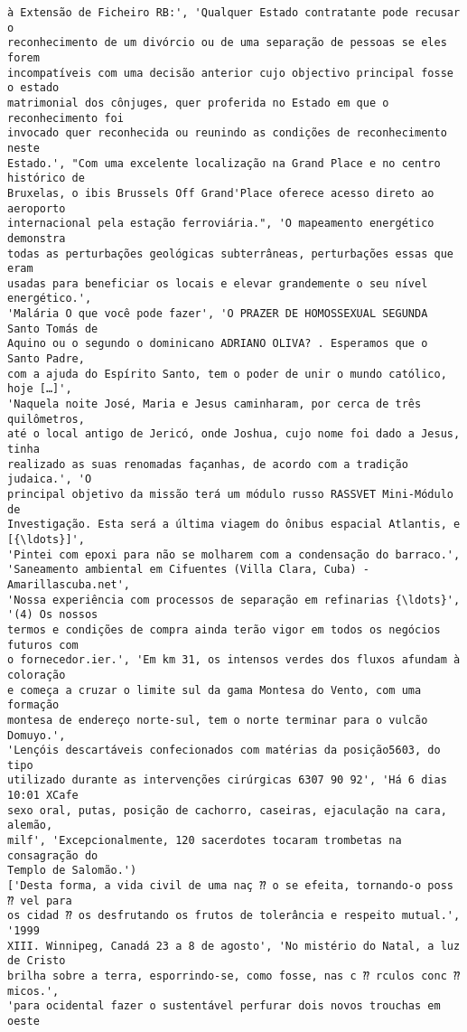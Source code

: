 \documentclass[10pt]{article}
\begin{document}
\begin{Verbatim}[commandchars=\\\{\}]
à Extensão de Ficheiro RB:', 'Qualquer Estado contratante pode recusar o
reconhecimento de um divórcio ou de uma separação de pessoas se eles forem
incompatíveis com uma decisão anterior cujo objectivo principal fosse o estado
matrimonial dos cônjuges, quer proferida no Estado em que o reconhecimento foi
invocado quer reconhecida ou reunindo as condições de reconhecimento neste
Estado.', "Com uma excelente localização na Grand Place e no centro histórico de
Bruxelas, o ibis Brussels Off Grand'Place oferece acesso direto ao aeroporto
internacional pela estação ferroviária.", 'O mapeamento energético demonstra
todas as perturbações geológicas subterrâneas, perturbações essas que eram
usadas para beneficiar os locais e elevar grandemente o seu nível energético.',
'Malária O que você pode fazer', 'O PRAZER DE HOMOSSEXUAL SEGUNDA Santo Tomás de
Aquino ou o segundo o dominicano ADRIANO OLIVA? . Esperamos que o Santo Padre,
com a ajuda do Espírito Santo, tem o poder de unir o mundo católico, hoje […]',
'Naquela noite José, Maria e Jesus caminharam, por cerca de três quilômetros,
até o local antigo de Jericó, onde Joshua, cujo nome foi dado a Jesus, tinha
realizado as suas renomadas façanhas, de acordo com a tradição judaica.', 'O
principal objetivo da missão terá um módulo russo RASSVET Mini-Módulo de
Investigação. Esta será a última viagem do ônibus espacial Atlantis, e [{\ldots}]',
'Pintei com epoxi para não se molharem com a condensação do barraco.',
'Saneamento ambiental em Cifuentes (Villa Clara, Cuba) - Amarillascuba.net',
'Nossa experiência com processos de separação em refinarias {\ldots}', '(4) Os nossos
termos e condições de compra ainda terão vigor em todos os negócios futuros com
o fornecedor.ier.', 'Em km 31, os intensos verdes dos fluxos afundam à coloração
e começa a cruzar o limite sul da gama Montesa do Vento, com uma formação
montesa de endereço norte-sul, tem o norte terminar para o vulcão Domuyo.',
'Lençóis descartáveis confecionados com matérias da posição5603, do tipo
utilizado durante as intervenções cirúrgicas 6307 90 92', 'Há 6 dias 10:01 XCafe
sexo oral, putas, posição de cachorro, caseiras, ejaculação na cara, alemão,
milf', 'Excepcionalmente, 120 sacerdotes tocaram trombetas na consagração do
Templo de Salomão.')
['Desta forma, a vida civil de uma naç ⁇ o se efeita, tornando-o poss ⁇ vel para
os cidad ⁇ os desfrutando os frutos de tolerância e respeito mutual.', '1999
XIII. Winnipeg, Canadá 23 a 8 de agosto', 'No mistério do Natal, a luz de Cristo
brilha sobre a terra, esporrindo-se, como fosse, nas c ⁇ rculos conc ⁇ micos.',
'para ocidental fazer o sustentável perfurar dois novos trouchas em oeste

\end{Verbatim}
\end{document}
